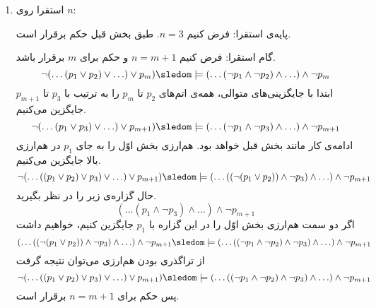 \begin{ans}
\begin{enumerate}
      \item
      استقرا روی $n$:
  
      پایه‌ی استقرا:
      فرض کنیم $n = 3$. طبق بخش قبل حکم برقرار است.
  
      گام استقرا:
      فرض کنیم $n = m+1$ و حکم برای $m$ برقرار باشد.
      $$\neg(\ldots(p_1\vee p_2)\vee \ldots)\vee p_m)\sledom\models (\ldots(\neg p_1\wedge \neg p_2)\wedge\ldots)\wedge\neg p_m$$
      ابتدا با جایگزینی‌های متوالی، همه‌ی اتم‌های $p_2$ تا $p_m$ را به ترتیب با $p_3$ تا $p_{m+1}$ جایگزین می‌کنیم.
      $$\neg(\ldots(p_1\vee p_3)\vee \ldots)\vee p_{m+1})\sledom\models (\ldots(\neg p_1\wedge \neg p_3)\wedge\ldots)\wedge\neg p_{m+1}$$
      ادامه‌ی کار مانند بخش قبل خواهد بود. هم‌ارزی بخش اوّل را به جای $p_1$ در هم‌ارزی بالا جایگزین می‌کنیم.
      $$\neg(\ldots((p_1 \vee p_2) \vee p_3)\vee \ldots)\vee p_{m+1})\sledom\models (\ldots((\neg (p_1 \vee p_2))\wedge \neg p_3)\wedge\ldots)\wedge\neg p_{m+1}$$
      حال گزاره‌ی زیر را در نظر بگیرید.
      $$(\ldots(p_1\wedge \neg p_3)\wedge\ldots)\wedge\neg p_{m+1}$$
      اگر دو سمت هم‌ارزی بخش اوّل را در این گزاره با $p_1$ جایگزین کنیم، خواهیم داشت
      $$ (\ldots((\neg (p_1 \vee p_2))\wedge \neg p_3)\wedge\ldots)\wedge\neg p_{m+1} \sledom\models (\ldots((\neg p_1 \wedge \neg p_2) \wedge \neg p_3)\wedge\ldots)\wedge\neg p_{m+1}  $$
      از تراگذری بودن هم‌ارزی می‌توان نتیجه گرفت
      $$ \neg(\ldots((p_1 \vee p_2) \vee p_3)\vee \ldots)\vee p_{m+1}) \sledom\models (\ldots((\neg p_1 \wedge \neg p_2) \wedge \neg p_3)\wedge\ldots)\wedge\neg p_{m+1}  $$
      پس حکم برای $n = m+1$ برقرار است.
    \end{enumerate}
  \end{ans}
  
